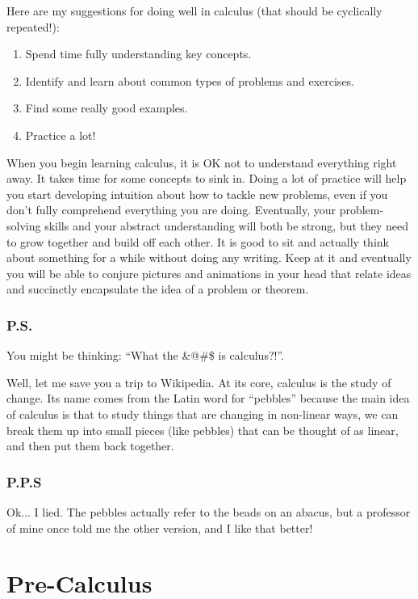 \documentclass{article}
\theoremstyle{definition}
\theoremstyle{definition}
\begin{document}
Here are my suggestions for doing well in calculus (that should be cyclically repeated!):

\begin{enumerate}
\item Spend time fully understanding key concepts.
\item Identify and learn about common types of problems and exercises.
\item Find some really good examples.
\item Practice a lot!
\end{enumerate}

When you begin learning calculus, it is OK not to understand everything right away. It takes time for some concepts to sink in. Doing a lot of practice will help you start developing intuition about how to tackle new problems, even if you don't fully comprehend everything you are doing. Eventually, your problem-solving skills and your abstract understanding will both be strong, but they need to grow together and build off each other. It is good to sit and actually think about something for a while without doing any writing. Keep at it and eventually you will be able to conjure pictures and animations in your head that relate ideas and succinctly encapsulate the idea of a problem or theorem.


\section*{P.S.}
You might be thinking: ``What the \&@\#\$ is calculus?!''.

Well, let me save you a trip to Wikipedia. At its core, calculus is the study of change. Its name comes from the Latin word for ``pebbles'' because the main idea of calculus is that to study things that are changing in non-linear ways, we can break them up into small pieces (like pebbles) that can be thought of as linear, and then put them back together.

\section*{P.P.S}
Ok... I lied. The pebbles actually refer to the beads on an abacus, but a professor of mine once told me the other version, and I like that better!





\newpage
\part{Pre-Calculus}
\end{document}
